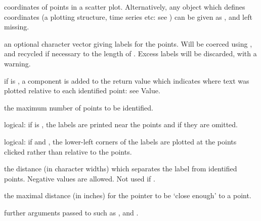\begin{Arguments}
\begin{ldescription}
\item[\code{x,y}] coordinates of points in a scatter plot.  Alternatively, any
object which defines coordinates (a plotting structure, time
series etc: see ) can be given as ,
and  left missing.
\item[\code{labels}] an optional character vector giving labels for the
points.  Will be coerced using , and
recycled if necessary to the length of .  Excess labels will
be discarded, with a warning.
\item[\code{pos}] if  is , a component is added to the
return value which indicates where text was plotted relative to each
identified point: see Value.
\item[\code{n}] the maximum number of points to be identified.
\item[\code{plot}] logical: if  is , the labels are
printed near the points and if  they are omitted.
\item[\code{atpen}] logical: if  and , the
lower-left corners of the labels are plotted at the points clicked
rather than relative to the points.
\item[\code{offset}] the distance (in character widths) which separates the
label from identified points.  Negative values are allowed.  Not
used if .
\item[\code{tolerance}] the maximal distance (in inches) for the pointer to be
`close enough' to a point.
\item[\code{...}] further arguments passed to  such as
,  and .
\end{ldescription}
\end{Arguments}
%
